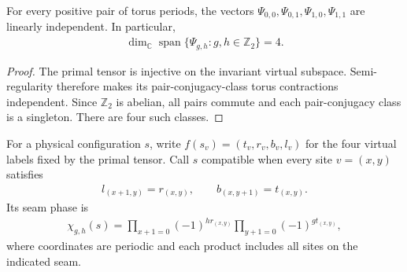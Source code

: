 \begin{lemma}
    \label{thm:toric_code_four_torus_sectors}
    \leanok
    For every positive pair of torus periods, the vectors
    $\Psi_{0,0},\Psi_{0,1},\Psi_{1,0},\Psi_{1,1}$ are linearly independent.
    In particular,
    \begin{align}
        \dim_{\mathbb C}\operatorname{span}
        \{\Psi_{g,h}:g,h\in\mathbb Z_2\}=4.
    \end{align}
\end{lemma}
\begin{proof}\leanok
    The primal tensor is injective on the invariant virtual subspace.
    Semi-regularity therefore makes its pair-conjugacy-class torus
    contractions independent. Since $\mathbb Z_2$ is abelian, all pairs
    commute and each pair-conjugacy class is a singleton. There are four
    such classes.
\end{proof}

\begin{definition}
    \label{def:toric_code_physical_seam_signs}
    \leanok
    For a physical configuration $s$, write
    $f(s_v)=(t_v,r_v,b_v,l_v)$ for the four virtual labels fixed by the
    primal tensor. Call $s$ compatible when every site $v=(x,y)$ satisfies
    \begin{align}
        l_{(x+1,y)}=r_{(x,y)},\qquad b_{(x,y+1)}=t_{(x,y)}.
    \end{align}
    Its seam phase is
    \begin{align}
        \chi_{g,h}(s)=
        \prod_{x+1=0}(-1)^{h r_{(x,y)}}
        \prod_{y+1=0}(-1)^{g t_{(x,y)}},
    \end{align}
    where coordinates are periodic and each product includes all sites
    on the indicated seam.
\end{definition}

